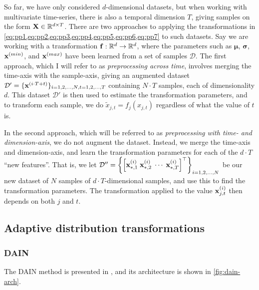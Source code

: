 \documentclass{statsmsc}
\begin{document}
{So far, we have only considered $d$-dimensional datasets, but when working with multivariate
time-series, there is also a temporal dimension $T$, giving samples on the form
$\mathbf{X} \in \mathbb{R}^{d\times T}$. There are two approaches to applying the
transformations in \cref{eq:pp1,eq:pp2,eq:pp3,eq:pp4,eq:pp5,eq:pp6,eq:pp7}
to such datasets. Say we are working with a transformation $\mathbf{f}: \mathbb{R}^d \rightarrow {\mathbb{R}^d}$, where the
parameters such as $\bm\mu$, $\bm\sigma$, $\mathbf{x}^{(min)}$, and $\mathbf{x}^{(max)}$ have been learned
from a set of samples $\mathcal{D}$. The first approach, which I will refer to as
\textit{preprocessing across time}, involves merging the time-axis with the sample-axis, giving
an augmented dataset $\mathcal{D}'=\{\mathbf{x}^{(i\cdot T +t)}\}_{i=1,2,\dots,N,t=1,2,\dots,T}$
containing $N \cdot T$ samples, each of dimensionality $d$. This dataset $\mathcal{D}'$ is then
used to estimate the transformation parameters, and to transform each sample, we do
$\tilde{x}_{j,t}=f_j(x_{j,t})$ regardless of what the value of $t$ is.

In the second approach, which will be referred to as
\textit{preprocessing with time- and dimension-axis}, we do not augment the dataset. Instead,
we merge the time-axis and dimension-axis, and learn the transformation parameters for
each of the $d \cdot T$ ``new features''. That is, we let
$\mathcal{D}''=\left\{\left[\mathbf{x}^{(i)}_{*,1} \; \mathbf{x}^{(i)}_{*,2} \; \cdots \; \mathbf{x}^{(i)}_{*,T} \right]^\top \right\}_{i=1,2,\dots,N}$ be our new dataset of $N$ samples of $d\cdot T$-dimensional samples, and
use this to find the transformation parameters. The transformation applied to the value
$\mathbf{x}^{(i)}_{j,t}$ then depends on both $j$ and $t$.


\subsection{Adaptive distribution transformations}%
\label{sub:Adaptive distribution transformations}


\subsubsection{DAIN}%
\label{ssub:DAIN}

The \ac{DAIN} method is presented in \cite{dain}, and its architecture is shown
in \cref{fig:dain-arch}.

}
\end{document}

